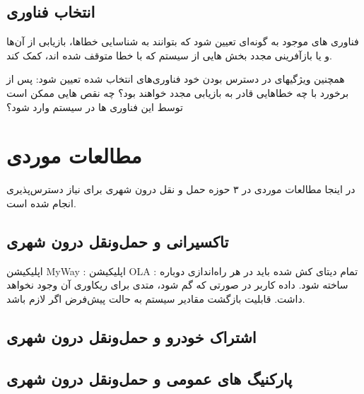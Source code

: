 \subsection{انتخاب فناوری}
فناوری های موجود به گونه‌ای تعیین شود که بتوانند به شناسایی خطا‌ها، بازیابی از آن‌ها و یا بازآفرینی مجدد بخش هایی از سیستم که با خطا متوقف شده اند، کمک کند.

همچنین ویژگیهای در دسترس بودن خود فناوری‌های انتخاب شده تعیین شود: پس از برخورد با چه خطا‌هایی قادر به بازیابی مجدد خواهند بود؟ چه نقص هایی ممکن است توسط این فناوری ها در سیستم وارد شود؟


\section{مطالعات موردی}

در اینجا مطالعات موردی در ۳ حوزه حمل و نقل درون شهری برای نیاز دسترس‌پذیری انجام شده است. 
\subsection{تاکسیرانی و حمل‌و‌نقل درون شهری}

اپلیکیشن MyWay : 
اپلیکیشن OLA : تمام دیتای کش شده باید در هر راه‌اندازی دوباره ساخته شود. داده کاربر در صورتی که گم شود، متدی برای ریکاوری آن وجود نخواهد داشت. قابلیت بازگشت مقادیر سیستم به حالت پیش‌فرض اگر لازم باشد.

\subsection{اشتراک خودرو و حمل‌و‌نقل درون شهری}


\subsection{پارکنیگ های عمومی و حمل‌و‌نقل درون شهری}

















